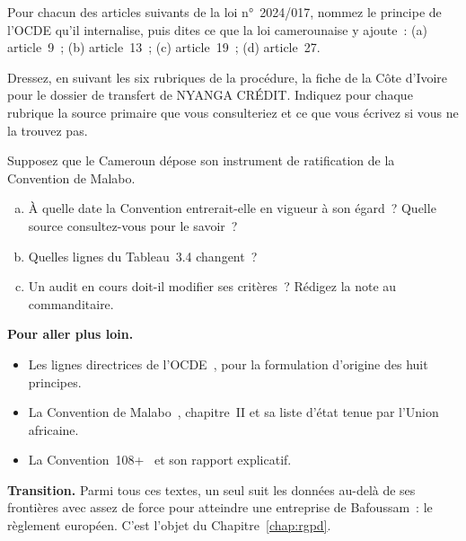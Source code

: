\begin{boxexo}[title={\ding{45}\quad Exercice~3.2. La filiation \niveaumoyen}]
Pour chacun des articles suivants de la loi n°~2024/017, nommez le principe
de l'OCDE qu'il internalise, puis dites ce que la loi camerounaise y ajoute~:
(a) article~9~; (b) article~13~; (c) article~19~; (d) article~27.
\end{boxexo}

\begin{boxexo}[title={\ding{45}\quad Exercice~3.3. La fiche pays \niveaumoyen}]
Dressez, en suivant les six rubriques de la procédure, la fiche de la Côte
d'Ivoire pour le dossier de transfert de NYANGA CRÉDIT. Indiquez pour chaque
rubrique la source primaire que vous consulteriez et ce que vous écrivez si
vous ne la trouvez pas.
\end{boxexo}

\begin{boxexo}[title={\ding{45}\quad Exercice~3.4. Si le Cameroun ratifiait \niveauexpert}]
Supposez que le Cameroun dépose son instrument de ratification de la
Convention de Malabo.
\begin{enumerate}[(a)]
    \item À quelle date la Convention entrerait-elle en vigueur à son égard~?
          Quelle source consultez-vous pour le savoir~?
    \item Quelles lignes du Tableau~3.4 changent~?
    \item Un audit en cours doit-il modifier ses critères~? Rédigez la note
          au commanditaire.
\end{enumerate}
\end{boxexo}

\bigskip

\begin{boxinfo}
\textbf{Pour aller plus loin.}
\begin{itemize}
    \item Les lignes directrices de l'OCDE~\cite{ocde1980}, pour la
          formulation d'origine des huit principes.
    \item La Convention de Malabo~\cite{ua2014malabo}, chapitre~II et sa
          liste d'état tenue par l'Union africaine.
    \item La Convention~108+~\cite{coe2018conv108plus} et son rapport
          explicatif.
\end{itemize}
\end{boxinfo}

\begin{boxinfo}
\textbf{Transition.} Parmi tous ces textes, un seul suit les données
au-delà de ses frontières avec assez de force pour atteindre une entreprise
de Bafoussam~: le règlement européen. C'est l'objet du
Chapitre~\ref{chap:rgpd}.
\end{boxinfo}
